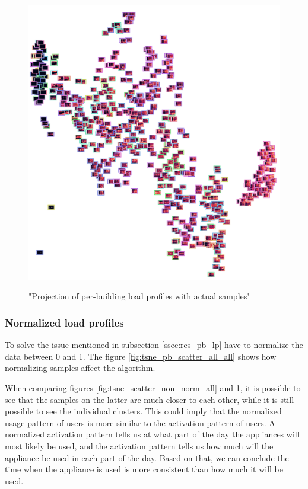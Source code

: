 \begin{figure}[H]
	\centering
	\caption{"Projection of per-building load profiles with actual samples"}
	\includegraphics[width=.9\textwidth]{Figures/TSNE/TSNE_per_building/non_norm/img_scatter_allall.png}
	\label{fig:tsne_pb_img_scatter_allall}
\end{figure}

\subsubsection{Normalized load profiles}

To solve the issue mentioned in subsection \ref{ssec:res_pb_lp} have to normalize the data between 0 and 1.
The figure \ref{fig:tsne_pb_scatter_all_all} shows how normalizing samples affect the algorithm.

When comparing figures \ref{fig:tsne_scatter_non_norm_all} and \ref{fig:tsne_pb_img_scatter_allall},
it is possible to see that the samples on the latter are much closer to each other,
while it is still possible to see the individual clusters.
This could imply that the normalized usage pattern of users is more similar to the activation pattern of users.
A normalized activation pattern tells us at what part of the day the appliances will most likely be used,
and the activation pattern tells us how much will the appliance be used in each part of the day.
Based on that, we can conclude the time when the appliance is used is more consistent than how much it will be used. 


